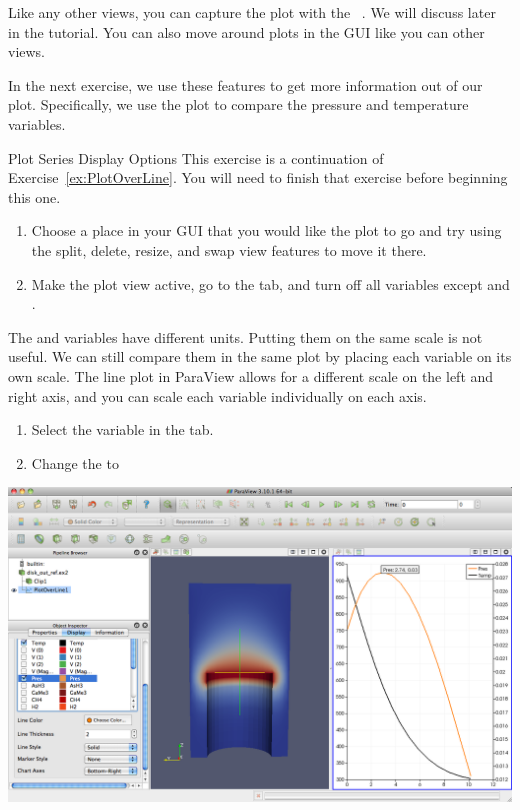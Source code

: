 Like any other views, you can capture the plot with the  \ra
{}~.  We will discuss  later in the tutorial.
You can also move around plots in the GUI like you can other views.

In the next exercise, we use these features to get more information out of
our plot.  Specifically, we use the plot to compare the pressure and
temperature variables.

\begin{exercise}{Plot Series Display Options}
  \label{ex:PlotSeriesDisplayOptions}%
  This exercise is a continuation of Exercise~\ref{ex:PlotOverLine}.  You
  will need to finish that exercise before beginning this one.

  \begin{enumerate}
  \item Choose a place in your GUI that you would like the plot to go and
    try using the split, delete, resize, and swap view features to move it
    there.
  \item Make the plot view active, go to the  tab, and turn
    off all variables except  and .
    \savecounter
  \end{enumerate}

  The  and  variables have different units.  Putting
  them on the same scale is not useful.  We can still compare them in the
  same plot by placing each variable on its own scale.  The line plot in
  ParaView allows for a different scale on the left and right axis, and you
  can scale each variable individually on each axis.

  \begin{enumerate}
    \restorecounter
  \item Select the  variable in the  tab.
  \item Change the  to 
  \end{enumerate}

  \begin{inlinefig}
    \includegraphics[width=\scw]{images/LinePlot3}
  \end{inlinefig}


\end{exercise}
